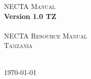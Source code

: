 \begin{titlepage}
\begin{center}
	\textsc{{\Huge NECTA Manual}}\\[0.4cm]
	\textbf{{\huge Version 1.0 TZ}}\\[1.5cm]
	\HRule\\[0.4cm]
	\textsc{{\Large NECTA Resource Manual}}\\[0.4cm]
	\textsc{{\Large Tanzania}}\\[0.4cm]
	\HRule\\[0.5cm]
\end{center}

\vfill
\begin{center}
	{\large \today}
\end{center}
\end{titlepage}
